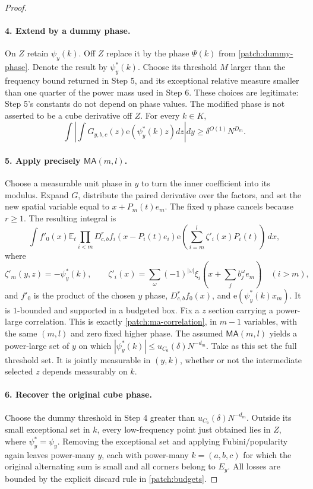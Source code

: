 \documentclass[11pt]{article}
\theoremstyle{definition}
\newcommand{\ee}[1]{\mathrm e\!\left(#1\right)}
\begin{document}
\begin{proof}
\paragraph{4. Extend by a dummy phase.}
On $Z$ retain $\psi_y(k)$.  Off $Z$ replace it by the phase $\Psi(k)$ from
\cref{patch:dummy-phase}.  Denote the result by $\psi_y^*(k)$.
Choose its threshold $M$ larger than the frequency bound returned in Step 5, and its exceptional
relative measure smaller than one quarter of the power mass used in Step 6.
These choices are legitimate: Step 5's constants do not depend on phase values.
The modified phase is not asserted to be a cube derivative off $Z$.
For every $k\in K$,
\[
 \int\left|\int G_{y,b,c}(z)\ee{\psi_y^*(k)z}dz\right|dy
                    \geq\delta^{O(1)}N^{D_m}.
\]

\paragraph{5. Apply precisely $\mathsf{MA}(m,l)$.}
Choose a measurable unit phase in $y$ to turn the inner coefficient into its modulus.
Expand $G$, distribute the paired derivative over the factors, and set the new spatial
variable equal to $x+P_m(t)e_m$.  The fixed $\eta$ phase cancels because $r\geq1$.
The resulting integral is
\[
 \int f'_0(x)\mathbb E_t\prod_{i<m}D_{c,b}^{r}f_i(x-P_i(t)e_i)
           \ee{\sum_{i=m}^l\zeta'_i(x)P_i(t)}\,dx,
\]
where
\[
 \zeta'_m(y,z)=-\psi_y^*(k),\qquad
 \zeta'_i(x)=\sum_\omega(-1)^{|\omega|}\xi_i(x+\textstyle\sum_j b_j^\omega e_m)
       \quad(i>m),
\]
and $f'_0$ is the product of the chosen $y$ phase, $D_{c,b}^{r}f_0(x)$, and
$\ee{\psi_y^*(k)x_m}$.  It is $1$-bounded and supported in a budgeted box.
Fix a $z$ section carrying a power-large correlation.  This is exactly
\eqref{patch:ma-correlation}, in $m-1$ variables, with the same $(m,l)$ and zero fixed higher
phase.  The assumed $\mathsf{MA}(m,l)$ yields a power-large set of $y$ on which
$|\psi_y^*(k)|\leq u_{C_6}(\delta)N^{-d_m}$.
Take as this set the full threshold set.  It is jointly measurable in $(y,k)$, whether or
not the intermediate selected $z$ depends measurably on $k$.

\paragraph{6. Recover the original cube phase.}
Choose the dummy threshold in Step 4 greater than $u_{C_6}(\delta)N^{-d_m}$.
Outside its small exceptional set in $k$, every low-frequency point just obtained lies in
$Z$, where $\psi_y^*=\psi_y$.
Removing the exceptional set and applying Fubini/popularity again leaves power-many $y$,
each with power-many $k=(a,b,c)$ for which the original alternating sum is small and all
corners belong to $E_y$.  All losses are bounded by the explicit discard rule in
\cref{patch:budgets}.


\end{proof}
\end{document}
